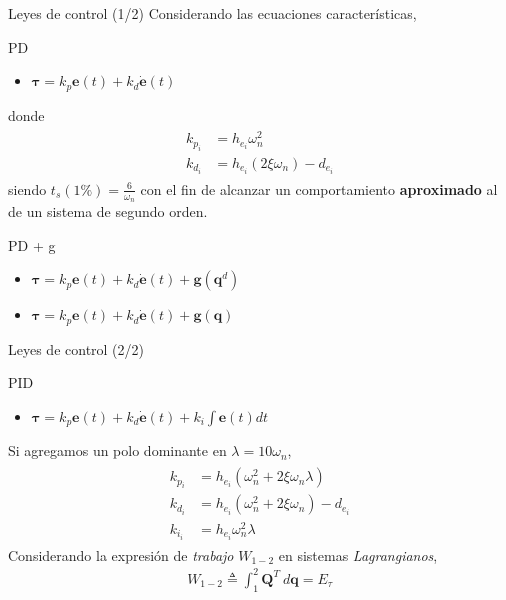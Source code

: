 \begin{frame}{Leyes de control (1/2)}
    Considerando las ecuaciones características, 
    \begin{block}{PD}
            \begin{itemize}
                \item $\boldsymbol{\tau}= k_p\boldsymbol{e}(t) + k_d\boldsymbol{\dot{e}}(t)$
            \end{itemize}
    \end{block}
    donde 
    \begin{align}
        \begin{split}
            k_{p_i} &= h_{e_i} \omega_n^2 \\
            k_{d_i} &= h_{e_i} \left(2 \xi \omega_n\right) - d_{e_i}
        \end{split}
    \end{align}
    siendo $t_s(1\%) = \frac{6}{\omega_n}$ con el fin de alcanzar un comportamiento \textbf{aproximado} al de un sistema de segundo orden. 

    \begin{block}{PD + g}
        \begin{itemize}
            \item $\boldsymbol{\tau} = k_p\boldsymbol{e}(t) + k_d\boldsymbol{\dot{e}}(t) + \boldsymbol{g}(\boldsymbol{q}^d)$
            \item $\boldsymbol{\tau} = k_p\boldsymbol{e}(t) + k_d\boldsymbol{\dot{e}}(t) + \boldsymbol{g}(\boldsymbol{q})$
        \end{itemize}
    \end{block}
\end{frame}

\begin{frame}{Leyes de control (2/2)}
    \begin{block}{PID}
        \begin{itemize}
            \item $\boldsymbol{\tau} = k_p \boldsymbol{e}(t) + k_d\boldsymbol{\dot{e}}(t) + k_i \int \boldsymbol{e}(t) dt$
        \end{itemize}
    \end{block}
    Si agregamos un polo dominante en $\lambda=10\omega_n$,
    \begin{align}
        \begin{split}
            k_{p_i} &= h_{e_i} \left(\omega_n^2 + 2 \xi \omega_n \lambda\right) \\
            k_{d_i} &= h_{e_i} \left(\omega_n^2 + 2 \xi \omega_n \right)- d_{e_i} \\
            k_{i_i} &= h_{e_i} \omega_n^2 \lambda
        \end{split}
    \end{align}
    Considerando la expresión de \emph{trabajo} $W_{1-2}$ en sistemas \emph{Lagrangianos},
    \begin{align}
        W_{1-2} \triangleq \int_{1}^{2} \boldsymbol{Q}^T \: d \boldsymbol{q} = E_\tau
    \end{align} 

\end{frame}